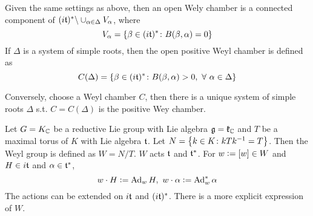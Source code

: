 \documentclass[a4paper,12pt]{article}
\begin{document}
	\begin{defn}
		Given the same settings as above, then an open Wely chamber is a connected component of $(i\mathfrak{t})^* \backslash \cup_{\alpha \in \Delta} V_{\alpha}$, where
		\begin{equation*}
			V_{\alpha} = \{\beta \in (i\mathfrak{t})^* \colon B(\beta,\alpha) = 0\} 
		\end{equation*}
		If $\Delta$ is a system of simple roots, then the open positive Weyl chamber is defined as
		\begin{equation*}
			C(\Delta) = \left\{\beta \in (i\mathfrak{t})^* \colon B(\beta,\alpha) > 0,~\forall~\alpha \in \Delta\right\}
		\end{equation*}
	\end{defn}
	\begin{rem}
		Conversely, choose a Weyl chamber $C$, then there is a unique system of simple roots $\Delta$ s.t. $C = C(\Delta)$ is the positive Wey chamber.
	\end{rem}

	Let $G=K_{\mathbb{C}}$ be a reductive Lie group with Lie algebra $\mathfrak{g} = \mathfrak{k}_{\mathbb{C}}$ and $T$ be a maximal torus of $K$ with Lie algebra $\mathfrak{t}$. Let $N = \left\{k \in K \colon kTk^{-1} = T\right\}$. Then the Weyl group is defined as $W = N / T$. $W$ acts $\mathfrak{t}$ and $\mathfrak{t}^*$. For $w \vcentcolon= [w] \in W$ and $H \in i\mathfrak{t}$ and $\alpha \in \mathfrak{t}^*$,
	\begin{equation*}
			w \cdot H \vcentcolon=  \operatorname{Ad}_{w} H,~w \cdot \alpha \vcentcolon= \operatorname{Ad}^{*}_{w}\alpha
	\end{equation*}
	The actions can be extended on $i\mathfrak{t}$ and $(i\mathfrak{t})^*$. There is a more explicit expression of $W$.
\end{document}
